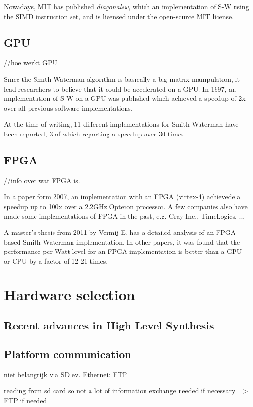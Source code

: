 Nowadays, MIT has published \emph{diagonalsw}, which an implementation of S-W using the SIMD instruction set, and is licensed under the open-source MIT license.

\subsection{GPU}

//hoe werkt GPU

Since the Smith-Waterman algorithm is basically a big matrix manipulation, it lead researchers to believe that it could be accelerated on a GPU. In 1997, an implementation of S-W on a GPU was published %
which achieved a speedup of 2x over all previous software implementations.

At the time of writing, 11 different implementations for Smith Waterman have been reported, 3 of which reporting a speedup over 30 times.

\subsection{FPGA}

//info over wat FPGA is.

In a paper form 2007, an implementation with an FPGA (virtex-4) achievede a speedup up to 100x over a 2.2GHz Opteron processor. %
A few companies also have made some implementations of FPGA in the past, e.g. Cray Inc., TimeLogics, ...

A master's thesis from 2011 by Vermij E. has a detailed analysis of an FPGA based Smith-Waterman implementation. In other papers, it was found that the performance per Watt level for an FPGA implementation is better than a GPU or CPU by a factor of 12-21 times.

\section{Hardware selection}

\subsection{Recent advances in High Level Synthesis}

\subsection{Platform communication}
niet belangrijk
via SD
ev. Ethernet: FTP

reading from sd card so not a lot of information exchange needed
if necessary => FTP if needed

